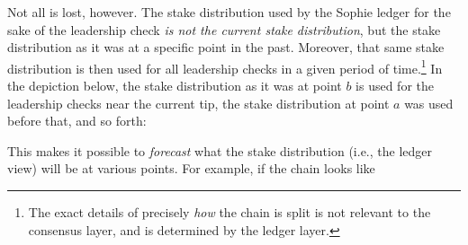 Not all is lost, however. The stake distribution used by the Sophie ledger for
the sake of the leadership check \emph{is not the \emph{current} stake
distribution}, but the stake distribution as it was at a specific point in the
past. Moreover, that same stake distribution is then used for all leadership
checks in a given period of time.\footnote{The exact details of precisely
\emph{how} the chain is split is not relevant to the consensus layer, and is
determined by the ledger layer.} In the depiction below, the stake distribution
as it was at point $b$ is used for the leadership checks near the current tip,
the stake distribution at point $a$ was used before that, and so forth:
%
\begin{center}
\end{center}
%
This makes it possible to \emph{forecast} what the stake distribution (i.e.,
the ledger view) will be at various points. For example, if the chain looks like
%
